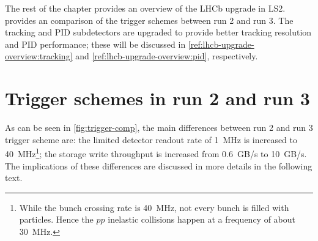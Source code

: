 The rest of the chapter provides an overview of the LHCb upgrade in LS2.
provides an comparison of the trigger schemes between run 2 and run 3.
The tracking and PID subdetectors are upgraded to provide better tracking
resolution and PID performance;
these will be discussed in \cref{ref:lhcb-upgrade-overview:tracking} and
\cref{ref:lhcb-upgrade-overview:pid}, respectively.


\section{Trigger schemes in run 2 and run 3}
\label{ref:lhcb-upgrade-overview:trigger}

As can be seen in \cref{fig:trigger-comp},
the main differences between run 2 and run 3 trigger scheme are:
the limited detector readout rate of 1~MHz is increased to 40~MHz\footnote{
    While the bunch crossing rate is 40~MHz,
    not every bunch is filled with particles.
    Hence the $pp$ inelastic collisions happen at a frequency of about 30~MHz.
};
the storage write throughput is increased from 0.6~GB/s to 10~GB/s.
The implications of these differences are discussed in more details in the
following text.


